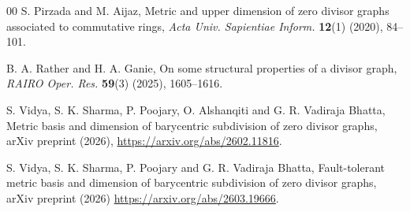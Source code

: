 \documentclass[12pt]{article}
\begin{document}
\begin{thebibliography}{00}
	S. Pirzada and M. Aijaz, Metric and upper dimension of zero divisor graphs associated to commutative rings, \textit{Acta Univ. Sapientiae Inform.} \textbf{12}(1) (2020), 84--101.
	
	B. A. Rather and H. A. Ganie, On some structural properties of a divisor graph, \textit{RAIRO Oper. Res.} \textbf{59}(3) (2025), 1605--1616.
	
	S. Vidya, S. K. Sharma, P. Poojary, O. Alshanqiti and G. R. Vadiraja Bhatta, Metric basis and dimension of barycentric subdivision of zero divisor graphs, arXiv preprint (2026), \url{https://arxiv.org/abs/2602.11816}.
	
	
	S. Vidya, S. K. Sharma, P. Poojary and G. R. Vadiraja Bhatta, Fault-tolerant metric basis and dimension of barycentric subdivision of zero divisor graphs, arXiv preprint (2026) \url{https://arxiv.org/abs/2603.19666}.
	
\end{thebibliography}
\end{document}
